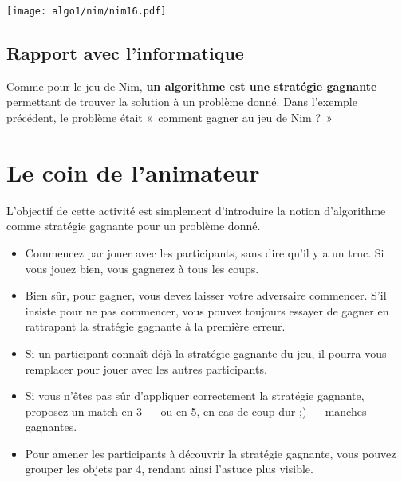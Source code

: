 \begin{center}
  \texttt{[image: algo1/nim/nim16.pdf]}
\end{center}

\subsection*{Rapport avec l'informatique}

Comme pour le jeu de Nim, \textbf{un algorithme est une stratégie gagnante}
permettant de trouver la solution à un problème donné. Dans l'exemple précédent,
le problème était «~comment gagner au jeu de Nim ?~»


\section*{Le coin de l'animateur}

L'objectif de cette activité est simplement d'introduire la notion d'algorithme
comme stratégie gagnante pour un problème donné.

\begin{itemize}
\item Commencez par jouer avec les participants, sans dire qu'il y a un truc. Si
  vous jouez bien, vous gagnerez à tous les coups.
\item Bien sûr, pour gagner, vous devez laisser votre adversaire commencer.
  S'il insiste pour ne pas commencer, vous pouvez toujours essayer de gagner en
  rattrapant la stratégie gagnante à la première erreur.
\item Si un participant connaît déjà la stratégie gagnante du jeu, il pourra
  vous remplacer pour jouer avec les autres participants.
\item Si vous n'êtes pas sûr d'appliquer correctement la stratégie gagnante,
  proposez un match en 3 --- ou en 5, en cas de coup dur ;) --- manches
  gagnantes.
\item Pour amener les participants à découvrir la stratégie gagnante, vous
  pouvez grouper les objets par 4, rendant ainsi l'astuce plus visible.
\end{itemize}


